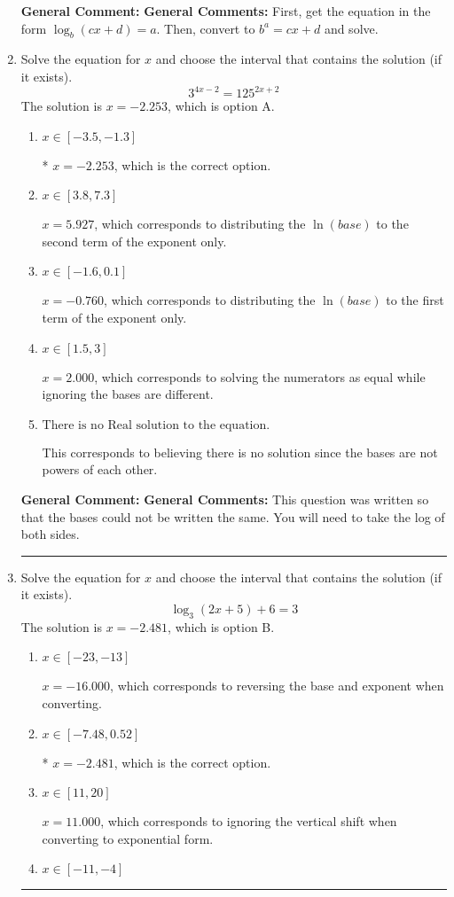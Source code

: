\documentclass{extbook}[14pt]
\newcommand{\litem}[1]{\item #1

\rule{\textwidth}{0.4pt}}
\begin{document}
\begin{enumerate}
{\textbf{General Comment:} \textbf{General Comments:} First, get the equation in the form $\log_b{(cx+d)} = a$. Then, convert to $b^a = cx+d$ and solve.
}
\litem{
Solve the equation for $x$ and choose the interval that contains the solution (if it exists).
\[ 3^{4x-2} = 125^{2x+2} \]The solution is \( x = -2.253 \), which is option A.\begin{enumerate}[label=\Alph*.]
\item \( x \in [-3.5, -1.3] \)

* $x = -2.253$, which is the correct option.
\item \( x \in [3.8, 7.3] \)

$x = 5.927$, which corresponds to distributing the $\ln(base)$ to the second term of the exponent only.
\item \( x \in [-1.6, 0.1] \)

$x = -0.760$, which corresponds to distributing the $\ln(base)$ to the first term of the exponent only.
\item \( x \in [1.5, 3] \)

$x = 2.000$, which corresponds to solving the numerators as equal while ignoring the bases are different.
\item \( \text{There is no Real solution to the equation.} \)

This corresponds to believing there is no solution since the bases are not powers of each other.
\end{enumerate}

\textbf{General Comment:} \textbf{General Comments:} This question was written so that the bases could not be written the same. You will need to take the log of both sides.
}
\litem{
Solve the equation for $x$ and choose the interval that contains the solution (if it exists).
\[ \log_{3}{(2x+5)}+6 = 3 \]The solution is \( x = -2.481 \), which is option B.\begin{enumerate}[label=\Alph*.]
\item \( x \in [-23, -13] \)

$x = -16.000$, which corresponds to reversing the base and exponent when converting.
\item \( x \in [-7.48, 0.52] \)

* $x = -2.481$, which is the correct option.
\item \( x \in [11, 20] \)

$x = 11.000$, which corresponds to ignoring the vertical shift when converting to exponential form.
\item \( x \in [-11, -4] \)


\end{enumerate}}
\end{enumerate}
\end{document}
